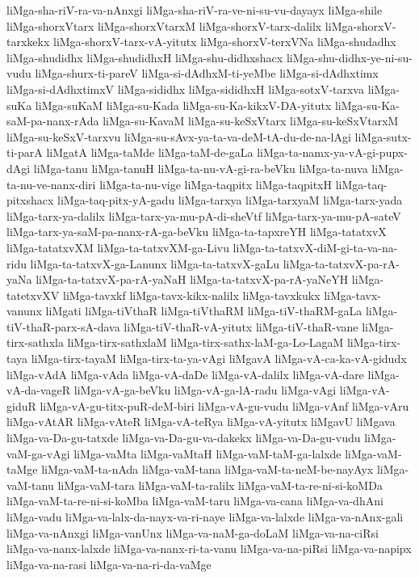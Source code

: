 {liMga-sha-riV-ra-va-nAnxgi
liMga-sha-riV-ra-ve-ni-su-vu-dayayx
liMga-shile
liMga-shorxVtarx
liMga-shorxVtarxM
liMga-shorxV-tarx-dalilx
liMga-shorxV-tarxkekx
liMga-shorxV-tarx-vA-yitutx
liMga-shorxV-terxVNa
liMga-shudadhx
liMga-shudidhx
liMga-shudidhxH
liMga-shu-didhxshacx
liMga-shu-didhx-ye-ni-su-vudu
liMga-shurx-ti-pareV
liMga-si-dAdhxM-ti-yeMbe
liMga-si-dAdhxtimx
liMga-si-dAdhxtimxV
liMga-sididhx
liMga-sididhxH
liMga-sotxV-tarxva
liMga-suKa
liMga-suKaM
liMga-su-Kada
liMga-su-Ka-kikxV-DA-yitutx
liMga-su-Ka-saM-pa-nanx-rAda
liMga-su-KavaM
liMga-su-keSxVtarx
liMga-su-keSxVtarxM
liMga-su-keSxV-tarxvu
liMga-su-sAvx-ya-ta-va-deM-tA-du-de-na-lAgi
liMga-sutx-ti-parA
liMgatA
liMga-taMde
liMga-taM-de-gaLa
liMga-ta-namx-ya-vA-gi-pupx-dAgi
liMga-tanu
liMga-tanuH
liMga-ta-nu-vA-gi-ra-beVku
liMga-ta-nuva
liMga-ta-nu-ve-nanx-diri
liMga-ta-nu-vige
liMga-taqpitx
liMga-taqpitxH
liMga-taq-pitxshacx
liMga-taq-pitx-yA-gadu
liMga-tarxya
liMga-tarxyaM
liMga-tarx-yada
liMga-tarx-ya-dalilx
liMga-tarx-ya-mu-pA-di-sheVtf
liMga-tarx-ya-mu-pA-sateV
liMga-tarx-ya-saM-pa-nanx-rA-ga-beVku
liMga-ta-tapxreYH
liMga-tatatxvX
liMga-tatatxvXM
liMga-ta-tatxvXM-ga-Livu
liMga-ta-tatxvX-diM-gi-ta-va-na-ridu
liMga-ta-tatxvX-ga-Lanunx
liMga-ta-tatxvX-gaLu
liMga-ta-tatxvX-pa-rA-yaNa
liMga-ta-tatxvX-pa-rA-yaNaH
liMga-ta-tatxvX-pa-rA-yaNeYH
liMga-tatetxvXV
liMga-tavxkf
liMga-tavx-kikx-nalilx
liMga-tavxkukx
liMga-tavx-vanunx
liMgati
liMga-tiVthaR
liMga-tiVthaRM
liMga-tiV-thaRM-gaLa
liMga-tiV-thaR-parx-sA-dava
liMga-tiV-thaR-vA-yitutx
liMga-tiV-thaR-vane
liMga-tirx-sathxla
liMga-tirx-sathxlaM
liMga-tirx-sathx-laM-ga-Lo-LagaM
liMga-tirx-taya
liMga-tirx-tayaM
liMga-tirx-ta-ya-vAgi
liMgavA
liMga-vA-ca-ka-vA-gidudx
liMga-vAdA
liMga-vAda
liMga-vA-daDe
liMga-vA-dalilx
liMga-vA-dare
liMga-vA-da-vageR
liMga-vA-ga-beVku
liMga-vA-ga-lA-radu
liMga-vAgi
liMga-vA-giduR
liMga-vA-gu-titx-puR-deM-biri
liMga-vA-gu-vudu
liMga-vAnf
liMga-vAru
liMga-vAtAR
liMga-vAteR
liMga-vA-teRya
liMga-vA-yitutx
liMgavU
liMgava
liMga-va-Da-gu-tatxde
liMga-va-Da-gu-va-dakekx
liMga-va-Da-gu-vudu
liMga-vaM-ga-vAgi
liMga-vaMta
liMga-vaMtaH
liMga-vaM-taM-ga-lalxde
liMga-vaM-taMge
liMga-vaM-ta-nAda
liMga-vaM-tana
liMga-vaM-ta-neM-be-nayAyx
liMga-vaM-tanu
liMga-vaM-tara
liMga-vaM-ta-ralilx
liMga-vaM-ta-re-ni-si-koMDa
liMga-vaM-ta-re-ni-si-koMba
liMga-vaM-taru
liMga-va-cana
liMga-va-dhAni
liMga-vadu
liMga-va-lalx-da-nayx-va-ri-naye
liMga-va-lalxde
liMga-va-nAnx-gali
liMga-va-nAnxgi
liMga-vanUnx
liMga-va-naM-ga-doLaM
liMga-va-na-ciRsi
liMga-va-nanx-lalxde
liMga-va-nanx-ri-ta-vanu
liMga-va-na-piRsi
liMga-va-napipx
liMga-va-na-rasi
liMga-va-na-ri-da-vaMge
}
